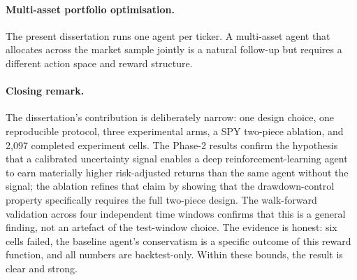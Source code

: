 \paragraph{Multi-asset portfolio optimisation.} The present dissertation runs one agent per ticker. A multi-asset agent that allocates across the market sample jointly is a natural follow-up but requires a different action space and reward structure.

\paragraph{Closing remark.} The dissertation's contribution is deliberately narrow: one design choice, one reproducible protocol, three experimental arms, a SPY two-piece ablation, and 2,097 completed experiment cells. The Phase-2 results confirm the hypothesis that a calibrated uncertainty signal enables a deep reinforcement-learning agent to earn materially higher risk-adjusted returns than the same agent without the signal; the ablation refines that claim by showing that the drawdown-control property specifically requires the full two-piece design. The walk-forward validation across four independent time windows confirms that this is a general finding, not an artefact of the test-window choice. The evidence is honest: six cells failed, the baseline agent's conservatism is a specific outcome of this reward function, and all numbers are backtest-only. Within these bounds, the result is clear and strong.
